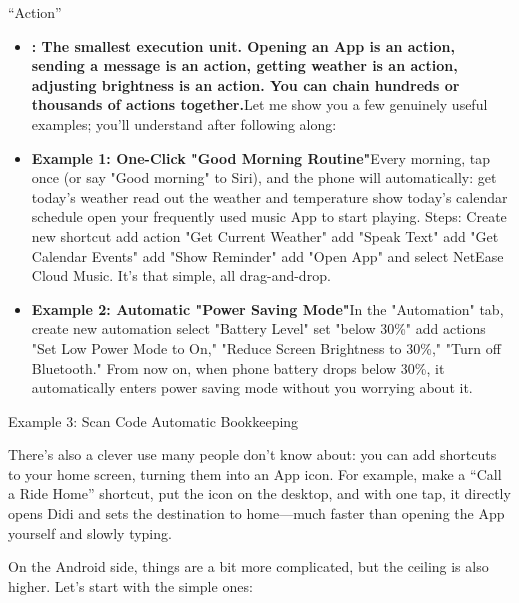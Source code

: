 “Action”

\begin{itemize}
  \item \textbf{: The smallest execution unit. Opening an App is an action, sending a message is an action, getting weather is an action, adjusting brightness is an action. You can chain hundreds or thousands of actions together.}Let me show you a few genuinely useful examples; you'll understand after following along:
  \item \textbf{Example 1: One-Click "Good Morning Routine"}Every morning, tap once (or say "Good morning" to Siri), and the phone will automatically: get today's weather read out the weather and temperature show today's calendar schedule open your frequently used music App to start playing. Steps: Create new shortcut add action "Get Current Weather" add "Speak Text" add "Get Calendar Events" add "Show Reminder" add "Open App" and select NetEase Cloud Music. It's that simple, all drag-and-drop.
  \item \textbf{Example 2: Automatic "Power Saving Mode"}In the "Automation" tab, create new automation select "Battery Level" set "below 30\%" add actions "Set Low Power Mode to On," "Reduce Screen Brightness to 30\%," "Turn off Bluetooth." From now on, when phone battery drops below 30\%, it automatically enters power saving mode without you worrying about it.
\end{itemize}

Example 3: Scan Code Automatic Bookkeeping


There's also a clever use many people don't know about: you can add shortcuts to your home screen, turning them into an App icon. For example, make a “Call a Ride Home” shortcut, put the icon on the desktop, and with one tap, it directly opens Didi and sets the destination to home—much faster than opening the App yourself and slowly typing.


On the Android side, things are a bit more complicated, but the ceiling is also higher. Let's start with the simple ones:

